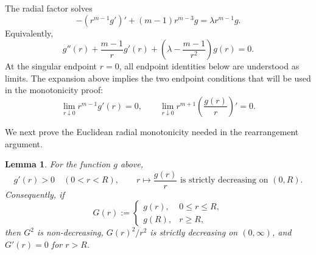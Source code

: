 \documentclass[11pt,letterpaper,reqno]{amsart}
\newtheorem{lemma}[theorem]{Lemma}
\theoremstyle{definition}
\begin{document}
The radial factor solves
\begin{equation}\label{eq:euclidean-ode}
        -(r^{m-1}g')'+(m-1)r^{m-3}g=\lambda r^{m-1}g.
\end{equation}
Equivalently,
\[
        g''(r)+\frac{m-1}{r}g'(r)
        +\left(\lambda-\frac{m-1}{r^2}\right)g(r)=0.
\]
At the singular endpoint \(r=0\), all endpoint identities below are
understood as limits. The expansion above implies the two endpoint
conditions that will be used in the monotonicity proof:
\[
        \lim_{r\downarrow0}r^{m-1}g'(r)=0,
        \qquad
        \lim_{r\downarrow0}r^{m+1}\left(\frac{g(r)}{r}\right)'=0.
\]




We next prove the Euclidean radial monotonicity needed in the
rearrangement argument.

\begin{lemma}\label{lem:euclidean-radial}
For the function \(g\) above,
\[
        g'(r)>0\quad(0<r<R),
        \qquad
        r\mapsto \frac{g(r)}{r}\text{ is strictly decreasing on }(0,R).
\]
Consequently, if
\[
        G(r):=
        \begin{cases}
        g(r),&0\leq r\leq R,\\
        g(R),&r\geq R,
        \end{cases}
\]
then \(G^2\) is non-decreasing, \(G(r)^2/r^2\) is strictly decreasing on
\((0,\infty)\), and \(G'(r)=0\) for \(r>R\).
\end{lemma}
\end{document}
